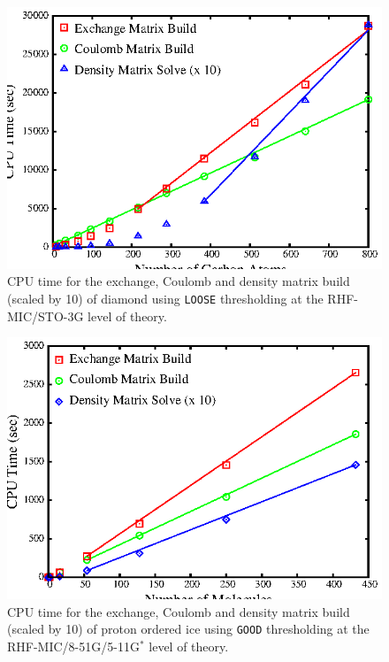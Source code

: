 \documentclass[prb,aps,nobibnotes,twocolumn,doublespace,twocolumngrid,superbib,showpacs]{revtex4}
\begin{document}
\begin{figure}[h]
\caption{CPU time for the exchange, Coulomb  and density 
matrix build (scaled by 10) of diamond using {\tt LOOSE} thresholding 
at the RHF-MIC/STO-3G level of theory.}
\label{DiamondScaling_1}
{\centering \includegraphics{Timing_Diamond_ONX_1.ps} \par}
\end{figure}

\begin{figure}[h]
\caption{CPU time for the exchange, Coulomb and density 
matrix build (scaled by 10) of proton ordered ice using {\tt GOOD}
thresholding at the RHF-MIC/8-51G/5-11G$^*$ level of theory.}
\label{IceScaling}
{\centering \includegraphics{Timing_pIce_ONX_1.ps} \par} 
\end{figure}
\end{document}
